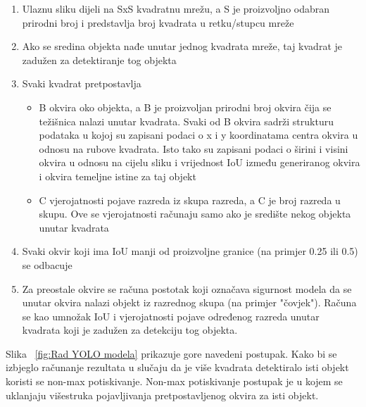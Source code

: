 \begin{enumerate}
    \item Ulaznu sliku dijeli na SxS kvadratnu mrežu, a S je proizvoljno odabran prirodni broj i predstavlja broj kvadrata u retku/stupcu mreže
    \item Ako se sredina objekta nađe unutar jednog kvadrata mreže, taj kvadrat je zadužen za detektiranje tog objekta
    \item Svaki kvadrat pretpostavlja
     \begin{itemize}
         \item  B okvira oko objekta, a B je proizvoljan prirodni broj okvira čija se težišnica nalazi unutar kvadrata.
        Svaki od B okvira sadrži strukturu podataka u kojoj su zapisani podaci o x i y koordinatama centra okvira u odnosu na rubove kvadrata. Isto tako su zapisani podaci o širini i 
          visini okvira u odnosu na cijelu sliku i vrijednost IoU između generiranog okvira i okvira temeljne istine za taj objekt
         \item  C vjerojatnosti pojave razreda iz skupa razreda, a C je broj razreda u skupu. Ove se vjerojatnosti računaju 
         samo ako je središte nekog objekta unutar kvadrata
    \end{itemize}
    \item Svaki okvir koji ima IoU manji od proizvoljne granice (na primjer 0.25 ili 0.5) se odbacuje
    \item Za preostale okvire se računa postotak koji označava sigurnost modela da se unutar okvira nalazi objekt iz razrednog skupa (na primjer "čovjek").
    Računa se kao umnožak IoU i vjerojatnosti pojave određenog razreda unutar kvadrata koji je zadužen za detekciju tog objekta.
\end{enumerate}
Slika ~\ref{fig:Rad YOLO modela} prikazuje gore navedeni postupak.
Kako bi se izbjeglo računanje rezultata u slučaju 
da je više kvadrata detektiralo isti objekt koristi se non-max potiskivanje. Non-max potiskivanje postupak je u kojem se uklanjaju višestruka pojavljivanja pretpostavljenog okvira za isti objekt.
